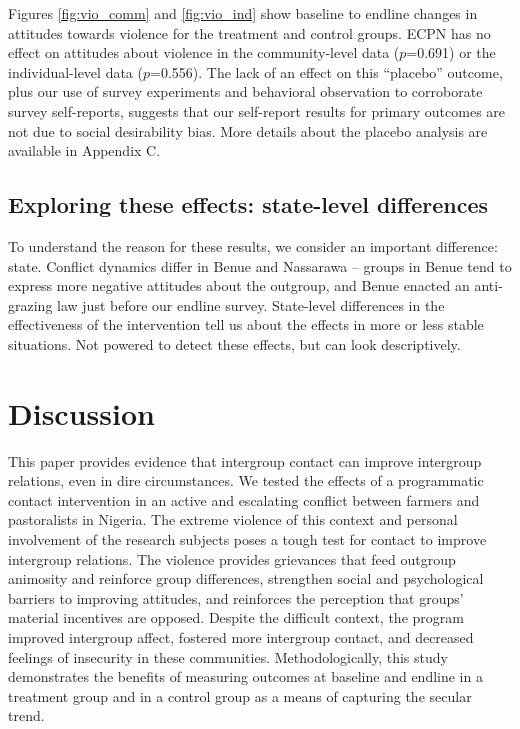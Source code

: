 \documentclass[11pt]{article}
\begin{document}
Figures \ref{fig:vio_comm} and \ref{fig:vio_ind} show baseline to
endline changes in attitudes towards violence for the treatment and
control groups. ECPN has no effect on attitudes about violence in the
community-level data (\(p\)=0.691) or the individual-level data
(\(p\)=0.556). The lack of an effect on this ``placebo'' outcome, plus
our use of survey experiments and behavioral observation to corroborate
survey self-reports, suggests that our self-report results for primary
outcomes are not due to social desirability bias. More details about the
placebo analysis are available in Appendix C.

\hypertarget{exploring-these-effects-state-level-differences}{%
\subsection{Exploring these effects: state-level
differences}\label{exploring-these-effects-state-level-differences}}

To understand the reason for these results, we consider an important
difference: state. Conflict dynamics differ in Benue and Nassarawa --
groups in Benue tend to express more negative attitudes about the
outgroup, and Benue enacted an anti-grazing law just before our endline
survey. State-level differences in the effectiveness of the intervention
tell us about the effects in more or less stable situations. Not powered
to detect these effects, but can look descriptively.

\hypertarget{discussion}{%
\section{Discussion}\label{discussion}}

This paper provides evidence that intergroup contact can improve
intergroup relations, even in dire circumstances. We tested the effects
of a programmatic contact intervention in an active and escalating
conflict between farmers and pastoralists in Nigeria. The extreme
violence of this context and personal involvement of the research
subjects poses a tough test for contact to improve intergroup relations.
The violence provides grievances that feed outgroup animosity and
reinforce group differences, strengthen social and psychological
barriers to improving attitudes, and reinforces the perception that
groups' material incentives are opposed. Despite the difficult context,
the program improved intergroup affect, fostered more intergroup
contact, and decreased feelings of insecurity in these communities.
Methodologically, this study demonstrates the benefits of measuring
outcomes at baseline and endline in a treatment group and in a control
group as a means of capturing the secular trend.
\end{document}
